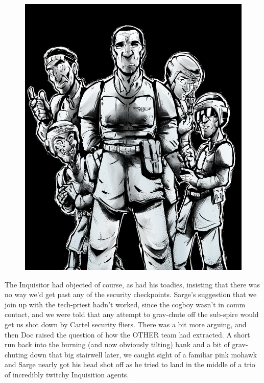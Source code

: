 \begin{figure}
	\begin{center}
		\includegraphics[width=\figwidth]{pics/18/38 large.png}
	\end{center}
\end{figure}
The Inquisitor had objected of course, as had his toadies, insisting that there was no way we'd get past any of the security checkpoints. 
Sarge's suggestion that we join up with the tech-priest hadn't worked, since the cogboy wasn't in comm contact, and we were told that any attempt to grav-chute off the sub-spire would get us shot down by Cartel security fliers. 
There was a bit more arguing, and then Doc raised the question of how the OTHER team had extracted. 
A short run back into the burning (and now obviously tilting) bank and a bit of grav-chuting down that big stairwell later, we caught sight of a familiar pink mohawk and Sarge nearly got his head shot off as he tried to land in the middle of a trio of incredibly twitchy Inquisition agents.


